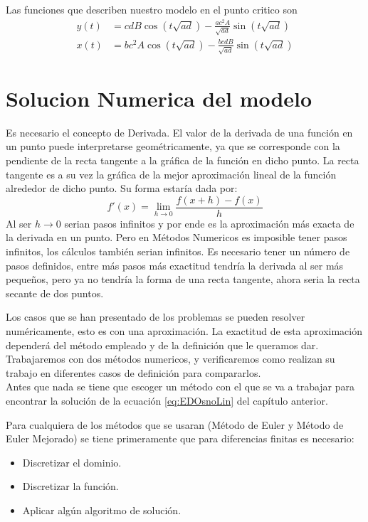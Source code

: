 \documentclass{report}
\begin{document}
Las funciones que describen nuestro modelo en el punto critico son
\begin{align*}
y(t)&=cdB\cos(t\sqrt{ad})
-\frac{ac^2A}{\sqrt{ad}}\sin(t\sqrt{ad}) \\
x(t)&=bc^2A\cos(t\sqrt{ad})-\frac{bcdB}{\sqrt{ad}}\sin(t\sqrt{ad})
\end{align*}

\chapter{Solucion Numerica del modelo}
Es necesario el concepto de Derivada.
El valor de la derivada de una función en un punto puede interpretarse geométricamente, ya que se corresponde con la pendiente de la recta tangente a la gráfica de la función en dicho punto. La recta tangente es a su vez la gráfica de la mejor aproximación lineal de la función alrededor de dicho punto.
Su forma estaría dada por:
\begin{equation}\label{eq:derivada}
f'(x)=\lim_{h\to{0}}\frac{f(x+h)-f(x)}{h}
\end{equation}
Al ser $h\to{0}$ serian pasos infinitos y por ende es la aproximación más exacta de la derivada en un punto. Pero en Métodos Numericos es imposible tener pasos infinitos, los cálculos también serian infinitos. Es necesario tener un número de pasos definidos, entre más pasos más exactitud tendría la derivada al ser más pequeños, pero ya no tendría la forma de una recta tangente, ahora seria la recta secante de dos puntos.

Los casos que se han presentado de los problemas se pueden resolver numéricamente, esto es con una aproximación. La exactitud de esta aproximación dependerá del método empleado y de la definición que le queramos dar. Trabajaremos con dos métodos numericos, y verificaremos como realizan su trabajo en diferentes casos de definición para compararlos.\\
Antes que nada se tiene que escoger un método con el que se va a trabajar para encontrar la solución de la ecuación \ref{eq:EDOsnoLin} del capítulo anterior.

Para cualquiera de los métodos que se usaran (Método de Euler y Método de Euler Mejorado) se tiene primeramente que para diferencias finitas es necesario:

\begin{itemize}
\item Discretizar el dominio.
\item Discretizar la función.
\item Aplicar algún algoritmo de solución.
\end{itemize}
\end{document}
